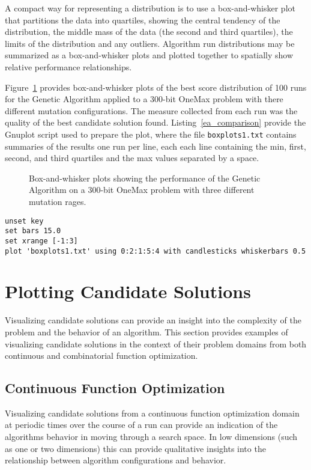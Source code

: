 \documentclass[a4paper, 11pt]{article}
\begin{document}
A compact way for representing a distribution is to use a box-and-whisker plot that partitions the data into quartiles, showing the central tendency of the distribution, the middle mass of the data (the second and third quartiles), the limits of the distribution and any outliers. Algorithm run distributions may be summarized as a box-and-whisker plots and plotted together to spatially show relative performance relationships.

Figure~\ref{plot:ga3} provides box-and-whisker plots of the best score distribution of 100 runs for the Genetic Algorithm applied to a 300-bit OneMax problem with there different mutation configurations. The measure collected from each run was the quality of the best candidate solution found. 
Listing~\ref{ea_comparison} provide the Gnuplot script used to prepare the plot, where the file \texttt{boxplots1.txt} contains summaries of the results one run per line, each each line containing the min, first, second, and third quartiles and the max values separated by a space.

\begin{figure}[htp]

\caption{Box-and-whisker plots showing the performance of the Genetic Algorithm on a 300-bit OneMax problem with three different mutation rages.}
\label{plot:ga3}
\end{figure}

\begin{lstlisting}[caption=Gnuplot script for creating a boxplot., label=ea_comparison]
unset key
set bars 15.0
set xrange [-1:3]
plot 'boxplots1.txt' using 0:2:1:5:4 with candlesticks whiskerbars 0.5
\end{lstlisting}

%
%
\section{Plotting Candidate Solutions}
Visualizing candidate solutions can provide an insight into the complexity of the problem and the behavior of an algorithm.  This section provides examples of visualizing candidate solutions in the context of their problem domains from both continuous and combinatorial function optimization.

\subsection{Continuous Function Optimization}
Visualizing candidate solutions from a continuous function optimization domain at periodic times over the course of a run can provide an indication of the algorithms behavior in moving through a search space. In low dimensions (such as one or two dimensions) this can provide qualitative insights into the relationship between algorithm configurations and behavior.
\end{document}
